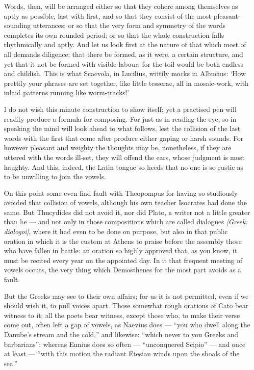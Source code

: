  Words, then, will be arranged either so that they cohere among themselves as aptly as possible, last with first, and so that they consist of the most pleasant-sounding utterances; or so that the very form and symmetry of the words completes its own rounded period; or so that the whole construction falls rhythmically and aptly. And let us look first at the nature of that which most of all demands diligence: that there be formed, as it were, a certain structure, and yet that it not be formed with visible labour; for the toil would be both endless and childish. This is what Scaevola, in Lucilius, wittily mocks in Albucius: `How prettily your phrases are set together, like little tesserae, all in mosaic-work, with inlaid patterns running like worm-tracks!'

 I do not wish this minute construction to show itself; yet a practised pen will readily produce a formula for composing. For just as in reading the eye, so in speaking the mind will look ahead to what follows, lest the collision of the last words with the first that come after produce either gaping or harsh sounds. For however pleasant and weighty the thoughts may be, nonetheless, if they are uttered with the words ill-set, they will offend the ears, whose judgment is most haughty. And this, indeed, the Latin tongue so heeds that no one is so rustic as to be unwilling to join the vowels.

 On this point some even find fault with Theopompus for having so studiously avoided that collision of vowels, although his own teacher Isocrates had done the same. But Thucydides did not avoid it, nor did Plato, a writer not a little greater than he — and not only in those compositions which are called dialogues \textit{[Greek: dialogoi]}, where it had even to be done on purpose, but also in that public oration in which it is the custom at Athens to praise before the assembly those who have fallen in battle: an oration so highly approved that, as you know, it must be recited every year on the appointed day. In it that frequent meeting of vowels occurs, the very thing which Demosthenes for the most part avoids as a fault.

 But the Greeks may see to their own affairs; for us it is not permitted, even if we should wish it, to pull voices apart. Those somewhat rough orations of Cato bear witness to it; all the poets bear witness, except those who, to make their verse come out, often left a gap of vowels, as Naevius does — ``you who dwell along the Danube's stream and the cold,'' and likewise: ``which never to you Greeks and barbarians''; whereas Ennius does so often — ``unconquered Scipio'' — and once at least — ``with this motion the radiant Etesian winds upon the shoals of the sea.''

